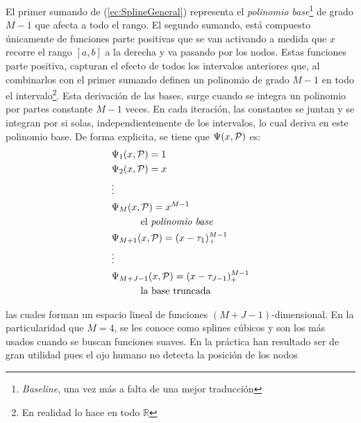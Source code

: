 \documentclass[../Main/Main.tex]{subfiles}
\begin{document}
El primer sumando de (\ref{ec:SplineGeneral}) representa el \textit{polinomio base}\footnote{\textit{Baseline}, una vez más a falta de una mejor traducción} de grado $M-1$ %
que afecta a todo el rango. El segundo sumando, está compuesto únicamente de funciones parte positivas que se van activando a medida que $x$ recorre el rango $[a,b]$ a la derecha y va pasando por los nodos. Estas funciones parte positiva, capturan el efecto de todos los intervalos anteriores que, al combinarlos con el primer sumando definen un polinomio de grado $M-1$ en todo el intervalo\footnote{En realidad lo hace en todo $\mathbb{R}$}. Esta derivación de las bases, surge cuando se integra un polinomio por partes constante $M-1$ veces. En cada iteración, las constantes se juntan y se integran por si solas, independientemente de los intervalos, lo cual deriva en este polinomio base. De forma explicita, se tiene que $\Psi(x,\P)$ es:
\begin{align*}
	&\Psi_1(x,\P) = 1 \\ 
	&\Psi_2(x,\P) = x \\ 
	& \vdots \\
	&\Psi_M(x,\P) = x^{M-1}\\
	& \quad \quad \quad \text{el \textit{polinomio base}}\\				
	&\Psi_{M + 1}(x,\P) = (x - \t_1)_+^{M-1} \\				
	& \vdots \\
	&\Psi_{M + J - 1}(x,\P) = (x - \t_{J - 1})_+^{M-1} \\
	& \quad \quad \quad \text{la base truncada}		 
\end{align*}

las cuales forman un espacio lineal de funciones $(M + J - 1)$-dimensional. En la particularidad que $M = 4$, se les conoce como splines cúbicos y son los más usados cuando se buscan funciones suaves. En la práctica han resultado ser de gran utilidad pues el ojo humano no detecta la posición de los nodos\\ 
\end{document}
